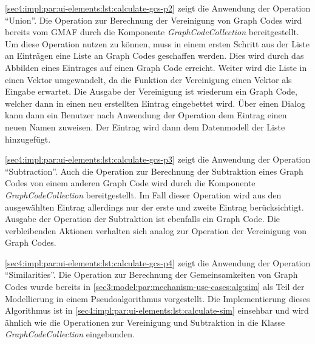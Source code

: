 

\cref{sec4:impl:par:ui-elements:lst:calculate-gcs-p2} zeigt die Anwendung der Operation \enquote{Union}.
Die Operation zur Berechnung der Vereinigung von Graph Codes wird bereits vom GMAF durch die Komponente \textit{GraphCodeCollection} bereitgestellt.
Um diese Operation nutzen zu können, muss in einem ersten Schritt aus der Liste an Einträgen eine Liste an Graph Codes geschaffen werden.
Dies wird durch das Abbilden eines Eintrages auf einen Graph Code erreicht.
Weiter wird die Liste in einen Vektor umgewandelt, da die Funktion der Vereinigung einen Vektor als Eingabe erwartet.
Die Ausgabe der Vereinigung ist wiederum ein Graph Code, welcher dann in einen neu erstellten Eintrag eingebettet wird.
Über einen Dialog kann dann ein Benutzer nach Anwendung der Operation dem Eintrag einen neuen Namen zuweisen.
Der Eintrag wird dann dem Datenmodell der Liste hinzugefügt.



\cref{sec4:impl:par:ui-elements:lst:calculate-gcs-p3} zeigt die Anwendung der Operation \enquote{Subtraction}.
Auch die Operation zur Berechnung der Subtraktion eines Graph Codes von einem anderen Graph Code wird durch die Komponente \textit{GraphCodeCollection} bereitgestellt.
Im Fall dieser Operation wird aus den ausgewählten Eintrag allerdings nur der erste und zweite Eintrag berücksichtigt.
Ausgabe der Operation der Subtraktion ist ebenfalls ein Graph Code.
Die verbleibenden Aktionen verhalten sich analog zur Operation der Vereinigung von Graph Codes.

\clearpage



\cref{sec4:impl:par:ui-elements:lst:calculate-gcs-p4} zeigt die Anwendung der Operation \enquote{Similarities}.
Die Operation zur Berechnung der Gemeinsamkeiten von Graph Codes wurde bereits in \cref{sec3:model:par:mechanism-use-cases:alg:sim} als Teil der Modellierung in einem Pseudoalgorithmus vorgestellt.
Die Implementierung dieses Algorithmus ist in \cref{sec4:impl:par:ui-elements:lst:calculate-sim} einsehbar und wird ähnlich wie die Operationen zur Vereinigung und Subtraktion in die Klasse \textit{GraphCodeCollection} eingebunden.

